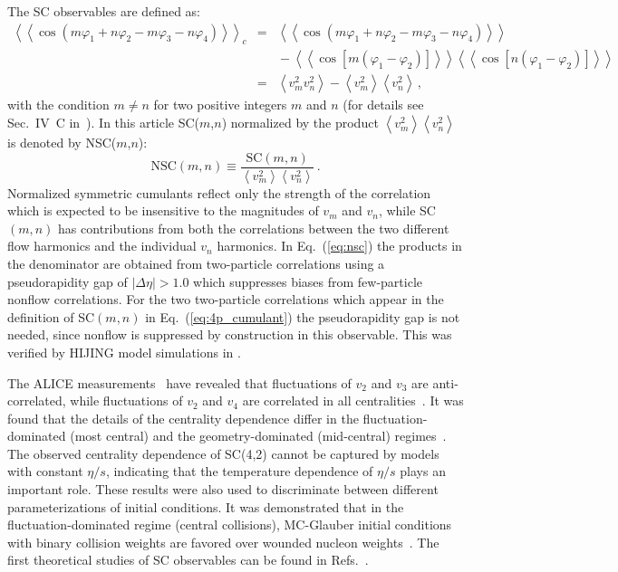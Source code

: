 The SC observables are defined as:
\begin{eqnarray}
\left<\left<\cos(m\varphi_1\!+\!n\varphi_2\!-\!m\varphi_3-\!n\varphi_4)\right>\right>_c &=& \left<\left<\cos(m\varphi_1\!+\!n\varphi_2\!-\!m\varphi_3-\!n\varphi_4)\right>\right>\nonumber\\
&&{}-\left<\left<\cos[m(\varphi_1\!-\!\varphi_2)]\right>\right>\left<\left<\cos[n(\varphi_1\!-\!\varphi_2)]\right>\right>\nonumber\\
&=&\left<v_{m}^2v_{n}^2\right>-\left<v_{m}^2\right>\left<v_{n}^2\right>\,,%
\label{eq:4p_cumulant}
\end{eqnarray}
%
with the condition $m\neq n$ for two positive integers $m$ and $n$ (for details see Sec.~IV~C in~\cite{Bilandzic:2013kga}).
In this article SC($m$,$n$) normalized by the product $\left<v_{m}^2\right>\left<v_{n}^2\right>$~\cite{ALICE:2016kpq,Giacalone:2016afq} is denoted by NSC($m$,$n$):
%
\begin{equation}
\mathrm{NSC}(m,n) \equiv \frac{\mathrm{SC}(m,n)}{\left<v_{m}^2\right>\left<v_{n}^2\right>}\,.
\label{eq:nsc}
\end{equation}
%
Normalized symmetric cumulants reflect only the strength of the correlation which is expected to be insensitive to the magnitudes of $v_{m}$ and $v_{n}$, while SC$(m,n)$ has contributions from both the correlations between the two different flow harmonics and the individual $v_{n}$ harmonics. In Eq.~(\ref{eq:nsc}) the products in the denominator are obtained from two-particle correlations using a pseudorapidity gap of $|\Delta\eta|>1.0$ which suppresses biases from few-particle nonflow correlations. For the two two-particle correlations which appear in the definition of SC$(m,n)$ in Eq.~(\ref{eq:4p_cumulant}) the pseudorapidity gap is not needed, since nonflow is suppressed by construction in this observable. This was verified by HIJING model simulations in \cite{ALICE:2016kpq}.

The ALICE measurements~\cite{ALICE:2016kpq} have revealed that fluctuations of $v_2$ and $v_3$ are anti-correlated, while fluctuations of $v_2$ and $v_4$ are correlated in all centralities~\cite{ALICE:2016kpq}. It was found that the details of the centrality dependence differ in the fluctuation-dominated (most central) and the geometry-dominated (mid-central) regimes~\cite{ALICE:2016kpq}. The observed centrality dependence of SC(4,2) cannot be captured by models with constant $\eta/s$, indicating that the temperature dependence of $\eta/s$ plays an important role. These results were also used to discriminate between different parameterizations of initial conditions. It was demonstrated that in the fluctuation-dominated regime (central collisions), MC-Glauber initial conditions with binary collision weights are favored over wounded nucleon weights~\cite{ALICE:2016kpq}. 
The first theoretical studies of SC observables can be found in Refs.~\cite{Giacalone:2016afq,Qian:2016pau,Gardim:2016nrr,Zhu:2016puf,Ke:2016jrd}.

